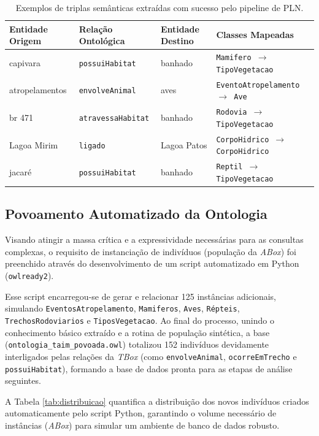 \documentclass[10pt,conference]{IEEEtran}
\begin{document}
\begin{table}[h]
\centering
\caption{Exemplos de triplas semânticas extraídas com sucesso pelo pipeline de PLN.}
\label{tab:triplas}
\begin{tabular}{@{}llll@{}}
\toprule
\textbf{Entidade Origem} & \textbf{Relação Ontológica} & \textbf{Entidade Destino} & \textbf{Classes Mapeadas} \\ \midrule
capivara & \texttt{possuiHabitat} & banhado & \texttt{Mamifero $\rightarrow$ TipoVegetacao} \\
atropelamentos & \texttt{envolveAnimal} & aves & \texttt{EventoAtropelamento $\rightarrow$ Ave} \\
br 471 & \texttt{atravessaHabitat} & banhado & \texttt{Rodovia $\rightarrow$ TipoVegetacao} \\
Lagoa Mirim & \texttt{ligado} & Lagoa Patos & \texttt{CorpoHidrico $\rightarrow$ CorpoHidrico} \\ 
jacaré & \texttt{possuiHabitat} & banhado & \texttt{Reptil $\rightarrow$ TipoVegetacao} \\ \bottomrule
\end{tabular}
\end{table}

\subsection{Povoamento Automatizado da Ontologia}

Visando atingir a massa crítica e a expressividade necessárias para as consultas complexas, o requisito de instanciação de indivíduos (população da \textit{ABox}) foi preenchido através do desenvolvimento de um script automatizado em Python (\texttt{owlready2}). 

Esse script encarregou-se de gerar e relacionar 125 instâncias adicionais, simulando \texttt{EventosAtropelamento}, \texttt{Mamiferos}, \texttt{Aves}, \texttt{Répteis}, \texttt{TrechosRodoviarios} e \texttt{TiposVegetacao}. Ao final do processo, unindo o conhecimento básico extraído e a rotina de população sintética, a base (\texttt{ontologia\_taim\_povoada.owl}) totalizou 152 indivíduos devidamente interligados pelas relações da \textit{TBox} (como \texttt{envolveAnimal}, \texttt{ocorreEmTrecho} e \texttt{possuiHabitat}), formando a base de dados pronta para as etapas de análise seguintes.

A Tabela \ref{tab:distribuicao} quantifica a distribuição dos novos indivíduos criados automaticamente pelo script Python, garantindo o volume necessário de instâncias (\textit{ABox}) para simular um ambiente de banco de dados robusto.
\end{document}
